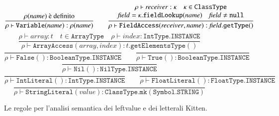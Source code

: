 \begin{figure}[th]
{\small
  \[
    \frac{\rho(\mathit{name})\text{ \`e definito}}
         {\rho\vdash\mathtt{Variable(\mathit{name})}:\rho(\mathit{name})}\qquad
    \frac{\begin{array}{c}
      \rho\vdash\mathit{receiver}:\kappa\quad\kappa\in\mathtt{ClassType}\\
      \mathit{field}=\kappa\mathtt{.fieldLookup(\mathit{name})}\quad
        \mathit{field}\not=\mathtt{null}
       \end{array}}
         {\rho\vdash\mathtt{FieldAccess(\mathit{receiver},\mathit{name})}:
          \mathit{field}\mathtt{.getType()}}
  \]
  \[
    \frac{\rho\vdash\mathit{array}:t\quad t\in\mathtt{ArrayType}\quad
          \rho\vdash\mathit{index}:\mathtt{IntType.INSTANCE}}
         {\rho\vdash\mathtt{ArrayAccess(\mathit{array},\mathit{index})}:
          t\mathtt{.getElementsType()}}
  \]
  \[
    \frac{}
         {\rho\vdash\mathtt{False()}:\mathtt{BooleanType.INSTANCE}}\qquad
    \frac{}
         {\rho\vdash\mathtt{True()}:\mathtt{BooleanType.INSTANCE}}\qquad
  \]
  \[
    \frac{}
         {\rho\vdash\mathtt{Nil()}:\mathtt{NilType.INSTANCE}}
  \]
  \[
    \frac{}
         {\rho\vdash\mathtt{IntLiteral()}:\mathtt{IntType.INSTANCE}}\qquad
    \frac{}
         {\rho\vdash\mathtt{FloatLiteral()}:\mathtt{FloatType.INSTANCE}}
  \]
  \[
    \frac{}
         {\rho\vdash\mathtt{StringLiteral(\mathit{value})}:
         \mathtt{ClassType.mk(Symbol.STRING)}}
  \]
}
\caption{Le regole per l'analisi semantica dei leftvalue e dei letterali Kitten.}
  \label{fig:analysis_expressions1}
\end{figure}
%
